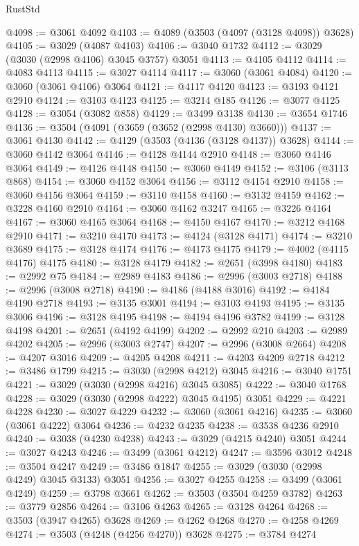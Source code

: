 \begin{lexlean}{RustStd}
\begin{coremodule}
@4098 := @3061 @4092
@4103 := @4089 (@3503 (@4097 (@3128 @4098)) @3628)
@4105 := @3029 (@4087 @4103)
@4106 := @3040 @1732
@4112 := @3029 (@3030 (@2998 @4106) @3045 @3757) @3051
@4113 := @4105 @4112
@4114 := @4083 @4113
@4115 := @3027 @4114
@4117 := @3060 (@3061 @4084)
@4120 := @3060 (@3061 @4106) @3064
@4121 := @4117 @4120
@4123 := @3193 @4121 @2910
@4124 := @3103 @4123
@4125 := @3214 @185
@4126 := @3077 @4125
@4128 := @3054 (@3082 @858)
@4129 := @3499 @3138
@4130 := @3654 @1746
@4136 := @3504 (@4091 (@3659 (@3652 (@2998 @4130) @3660)))
@4137 := @3061 @4130
@4142 := @4129 (@3503 (@4136 (@3128 @4137)) @3628)
@4144 := @3060 @4142 @3064
@4146 := @4128 @4144 @2910
@4148 := @3060 @4146 @3064
@4149 := @4126 @4148
@4150 := @3060 @4149
@4152 := @3106 (@3113 @868)
@4154 := @3060 @4152 @3064
@4156 := @3112 @4154 @2910
@4158 := @3060 @4156 @3064
@4159 := @3110 @4158
@4160 := @3132 @4159
@4162 := @3228 @4160 @2910
@4164 := @3060 @4162 @3247
@4165 := @3226 @4164
@4167 := @3060 @4165 @3064
@4168 := @4150 @4167
@4170 := @3212 @4168 @2910
@4171 := @3210 @4170
@4173 := @4124 (@3128 @4171)
@4174 := @3210 @3689
@4175 := @3128 @4174
@4176 := @4173 @4175
@4179 := @4002 (@4115 @4176) @4175
@4180 := @3128 @4179
@4182 := @2651 (@3998 @4180)
@4183 := @2992 @75
@4184 := @2989 @4183
@4186 := @2996 (@3003 @2718)
@4188 := @2996 (@3008 @2718)
@4190 := @4186 (@4188 @3016)
@4192 := @4184 @4190 @2718
@4193 := @3135 @3001
@4194 := @3103 @4193
@4195 := @3135 @3006
@4196 := @3128 @4195
@4198 := @4194 @4196 @3782
@4199 := @3128 @4198
@4201 := @2651 (@4192 @4199)
@4202 := @2992 @210
@4203 := @2989 @4202
@4205 := @2996 (@3003 @2747)
@4207 := @2996 (@3008 @2664)
@4208 := @4207 @3016
@4209 := @4205 @4208
@4211 := @4203 @4209 @2718
@4212 := @3486 @1799
@4215 := @3030 (@2998 @4212) @3045
@4216 := @3040 @1751
@4221 := @3029 (@3030 (@2998 @4216) @3045 @3085)
@4222 := @3040 @1768
@4228 := @3029 (@3030 (@2998 @4222) @3045 @4195) @3051
@4229 := @4221 @4228
@4230 := @3027 @4229
@4232 := @3060 (@3061 @4216)
@4235 := @3060 (@3061 @4222) @3064
@4236 := @4232 @4235
@4238 := @3538 @4236 @2910
@4240 := @3038 (@4230 @4238)
@4243 := @3029 (@4215 @4240) @3051
@4244 := @3027 @4243
@4246 := @3499 (@3061 @4212)
@4247 := @3596 @3012
@4248 := @3504 @4247
@4249 := @3486 @1847
@4255 := @3029 (@3030 (@2998 @4249) @3045 @3133) @3051
@4256 := @3027 @4255
@4258 := @3499 (@3061 @4249)
@4259 := @3798 @3661
@4262 := @3503 (@3504 @4259 @3782)
@4263 := @3779 @2856
@4264 := @3106 @4263
@4265 := @3128 @4264
@4268 := @3503 (@3947 @4265) @3628
@4269 := @4262 @4268
@4270 := @4258 @4269
@4274 := @3503 (@4248 (@4256 @4270)) @3628
@4275 := @3784 @4274

\end{coremodule}
\end{lexlean}
